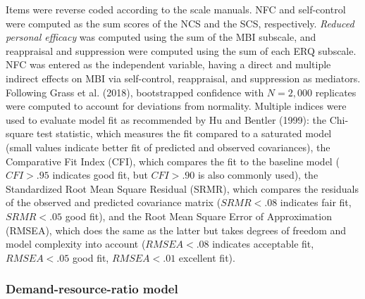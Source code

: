 \documentclass[
  english,
  man,floatsintext]{apa6}
\begin{document}
Items were reverse coded according to the scale manuals.
NFC and self-control were computed as the sum scores of the NCS and the SCS, respectively.
\emph{Reduced personal efficacy} was computed using the sum of the MBI subscale, and reappraisal and suppression were computed using the sum of each ERQ subscale.
NFC was entered as the independent variable, having a direct and multiple indirect effects on MBI via self-control, reappraisal, and suppression as mediators.
Following Grass et al. (2018), bootstrapped confidence with \(N=2,000\) replicates were computed to account for deviations from normality.
Multiple indices were used to evaluate model fit as recommended by Hu and Bentler (1999): the Chi-square test statistic, which measures the fit compared to a saturated model (small values indicate better fit of predicted and observed covariances), the Comparative Fit Index (CFI), which compares the fit to the baseline model (\(CFI>.95\) indicates good fit, but \(CFI>.90\) is also commonly used), the Standardized Root Mean Square Residual (SRMR), which compares the residuals of the observed and predicted covariance matrix (\(SRMR<.08\) indicates fair fit, \(SRMR<.05\) good fit), and the Root Mean Square Error of Approximation (RMSEA), which does the same as the latter but takes degrees of freedom and model complexity into account (\(RMSEA<.08\) indicates acceptable fit, \(RMSEA<.05\) good fit, \(RMSEA<.01\) excellent fit).

\hypertarget{demand-resource-ratio-model}{%
\subsubsection{Demand-resource-ratio model}\label{demand-resource-ratio-model}}
\end{document}
